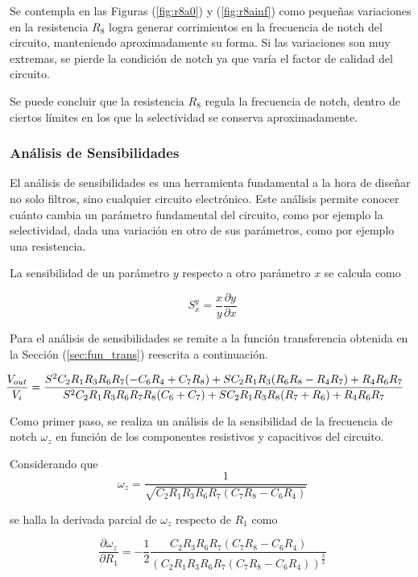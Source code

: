 Se contempla en las Figuras (\ref{fig:r8a0}) y (\ref{fig:r8ainf}) como pequeñas variaciones en la resistencia $R_8$ logra generar corrimientos en la frecuencia de notch del circuito, manteniendo aproximadamente su forma. Si las variaciones son muy extremas, se pierde la condición de notch ya que varía el factor de calidad del circuito.

Se puede concluir que la resistencia $R_8$ regula la frecuencia de notch, dentro de ciertos límites en los que la selectividad se conserva aproximadamente.

\subsubsection{Análisis de Sensibilidades}
\label{sec:sens}

El análisis de sensibilidades es una herramienta fundamental a la hora de diseñar no solo filtros, sino cualquier circuito electrónico. Este análisis permite conocer cuánto cambia un parámetro fundamental del circuito, como por ejemplo la selectividad, dada una variación en otro de sus parámetros, como por ejemplo una resistencia.

La sensibilidad de un parámetro $y$ respecto a otro parámetro $x$ se calcula como

\begin{equation}
S^y_x = \frac{x}{y} \frac{\partial y}{\partial x}
\end{equation}

Para el análisis de sensibilidades se remite a la función transferencia obtenida en la Sección (\ref{sec:fun_trans}) reescrita a continuación.

\[
\hspace{-0.5cm}
\frac{V_{out}}{V_i} = \frac{S^2 C_2 R_1 R_3 R_6 R_7 (-C_6 R_4 + C_7 R_8) + S C_2 R_1 R_3 (R_6 R_8 - R_4 R_7) + R_4 R_6 R_7}{S^2 C_2 R_1 R_3 R_6 R_7 R_8 (C_6 + C_7)+S C_2 R_1 R_3 R_8 (R_7 + R_6) + R_4 R_6 R_7}
\]

Como primer paso, se realiza un análisis de la sensibilidad de la frecuencia de notch $\omega_z$ en función de los componentes resistivos y capacitivos del circuito.

Considerando que
\begin{equation}
\omega_z = \frac{1}{\sqrt{C_2 R_1 R_3 R_6 R_7 (C_7 R_8 - C_6 R_4)}}
\end{equation}

se halla la derivada parcial de $\omega_z$ respecto de $R_1$ como

\begin{equation}
\frac{\partial \omega_z}{\partial R_1} = -\frac{1}{2} \frac{C_2 R_3 R_6 R_7 (C_7 R_8 - C_6 R_4)}{(C_2 R_1 R_3 R_6 R_7 (C_7 R_8 - C_6 R_4))^{\frac{3}{2}}}
\end{equation}

